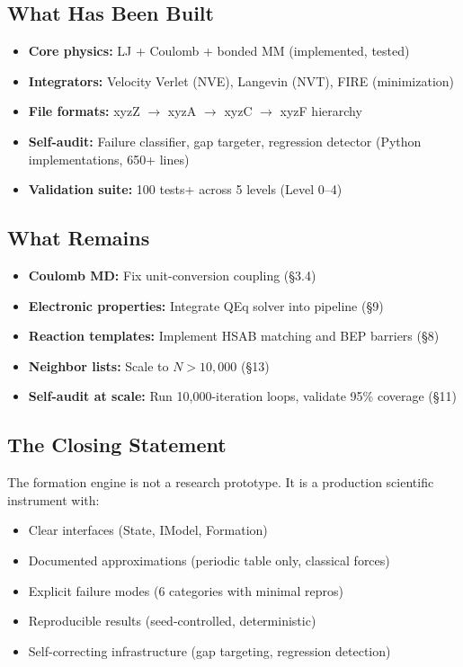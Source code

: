 \documentclass[11pt]{article}
\begin{document}
\subsection{What Has Been Built}

\begin{itemize}
\item \textbf{Core physics:} LJ + Coulomb + bonded MM (implemented, tested)
\item \textbf{Integrators:} Velocity Verlet (NVE), Langevin (NVT), FIRE (minimization)
\item \textbf{File formats:} xyzZ $\to$ xyzA $\to$ xyzC $\to$ xyzF hierarchy
\item \textbf{Self-audit:} Failure classifier, gap targeter, regression detector (Python implementations, 650+ lines)
\item \textbf{Validation suite:} 100 tests+ across 5 levels (Level 0--4)
\end{itemize}

\subsection{What Remains}

\begin{itemize}
\item \textbf{Coulomb MD:} Fix unit-conversion coupling (§3.4)
\item \textbf{Electronic properties:} Integrate QEq solver into pipeline (§9)
\item \textbf{Reaction templates:} Implement HSAB matching and BEP barriers (§8)
\item \textbf{Neighbor lists:} Scale to $N > 10{,}000$ (§13)
\item \textbf{Self-audit at scale:} Run 10,000-iteration loops, validate 95\% coverage (§11)
\end{itemize}

\subsection{The Closing Statement}

The formation engine is not a research prototype. It is a production scientific instrument with:

\begin{itemize}
\item Clear interfaces (State, IModel, Formation)
\item Documented approximations (periodic table only, classical forces)
\item Explicit failure modes (6 categories with minimal repros)
\item Reproducible results (seed-controlled, deterministic)
\item Self-correcting infrastructure (gap targeting, regression detection)
\end{itemize}
\end{document}
